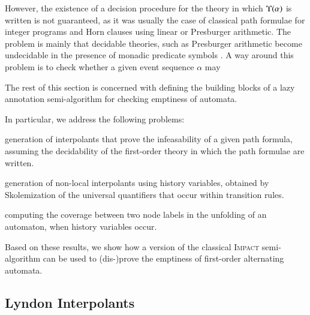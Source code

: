 \documentclass{llncs}
\begin{document}

However, the existence of a decision procedure for the theory in which
$\Upsilon({\alpha})$ is written is not guaranteed, as it was usually the
case of classical path formulae for integer programs \cite{McMillan06}
and Horn clauses \cite{BjornerGurfinkelMcMillanRybalchenko15} using
linear or Presburger arithmetic. The problem is mainly that decidable
theories, such as Presburger arithmetic become undecidable in the
presence of monadic predicate symbols \cite{Halpern91}. A way around
this problem is to check whether a given event sequence $\alpha$ may 



The rest of this section is concerned with defining the building
blocks of a lazy annotation semi-algorithm for checking emptiness of
automata. 

In particular, we address the following problems: \begin{compactenum}
%
\item generation of interpolants that prove the infeasability of a
  given path formula, assuming the decidability of the first-order
  theory in which the path formulae are written. 
%
\item generation of non-local interpolants using history variables,
  obtained by Skolemization of the universal quantifiers that occur
  within transition rules.
%
\item computing the coverage between two node labels in the unfolding
  of an automaton, when history variables occur. 
\end{compactenum} 
Based on these results, we show how a version of the classical
\textsc{Impact} \cite{McMillan06} semi-algorithm can be used to
(dis-)prove the emptiness of first-order alternating automata. 

\subsection{Lyndon Interpolants}
\end{document}
